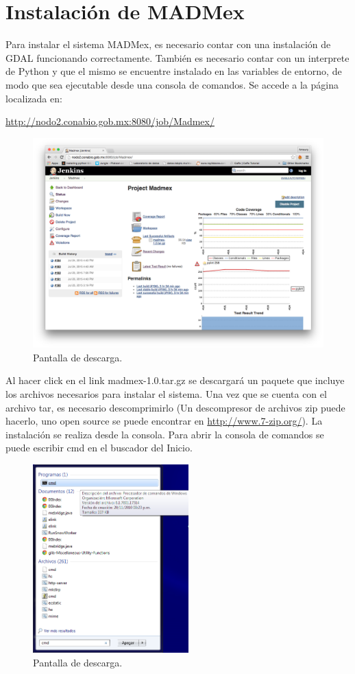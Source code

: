\documentclass[11pt, spanish]{memoir}
\begin{document}
\chapter{Instalación de MADMex}
Para instalar el sistema MADMex, es necesario contar con una instalación de GDAL
 funcionando correctamente. También es necesario contar con un interprete de Python
 y que el mismo se encuentre instalado en las variables de entorno, de modo que sea
 ejecutable desde una consola de comandos.
Se accede a la página localizada en:

\url{http://nodo2.conabio.gob.mx:8080/job/Madmex/}

\begin{figure}[H]
\centering
\includegraphics[width=14cm]{screen1.png}
\caption{Pantalla de descarga. \label{overflow}}
\end{figure}
Al hacer click en el link madmex-1.0.tar.gz se descargará un paquete que incluye
los archivos necesarios para instalar el sistema. Una vez que se cuenta con el
archivo tar, es necesario descomprimirlo (Un descompresor de archivos zip puede
hacerlo, uno open source se puede encontrar en \url{http://www.7-zip.org/}). La
instalación se realiza desde la consola. Para abrir la consola de comandos se puede
escribir cmd en el buscador del Inicio.

\begin{figure}[H]
\centering
\includegraphics[width=6cm]{command1.png}
\caption{Pantalla de descarga. \label{overflow}}
\end{figure}
\end{document}
